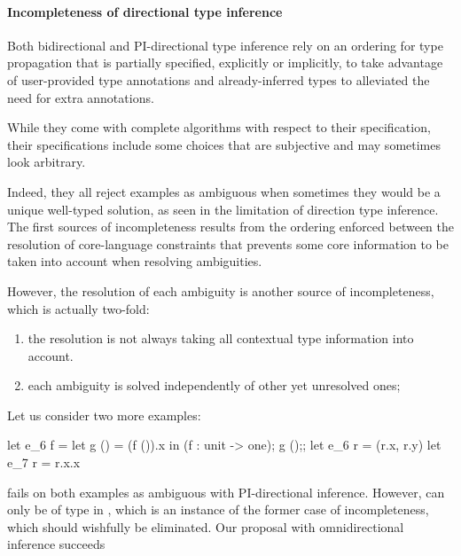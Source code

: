 \documentclass[acmsmall,screen,nonacm]{acmart}
\begin{document}
\paragraph{Incompleteness of directional type inference}

Both bidirectional and PI-directional type inference rely on an ordering
for type propagation that is partially specified, explicitly or implicitly,
to take advantage of user-provided type annotations and already-inferred types
to alleviated the need for extra annotations.

While they come with complete algorithms with respect to their
specification, their specifications include some choices that are subjective
and may sometimes look arbitrary.

Indeed, they all reject examples as ambiguous when sometimes they would be a
unique well-typed solution, as seen in the limitation of direction type
inference.  The first sources of incompleteness results from the ordering
enforced between the resolution of core-language constraints that prevents
some core information to be taken into account when resolving ambiguities.

However, the resolution of each ambiguity is another source of
incompleteness, which is actually two-fold:
\begin{enumerate}
\item
  the resolution is not always taking all contextual type information into
  account.
\item
  each ambiguity is solved independently of other yet unresolved ones;
\end{enumerate}
Let us consider two more examples:
\begin{program}[error]
let e_6 f = let g () = (f ()).x in (f : unit -> one); g ();;
let e_6 r = (r.x, r.y)
let e_7 r = r.x.x
\end{program}
\OCaml fails on both examples as ambiguous with PI-directional inference.
However,  can only be of type  in , which
is an instance of the former case of incompleteness, which should wishfully
be eliminated. Our proposal with omnidirectional inference succeeds

\end{document}
